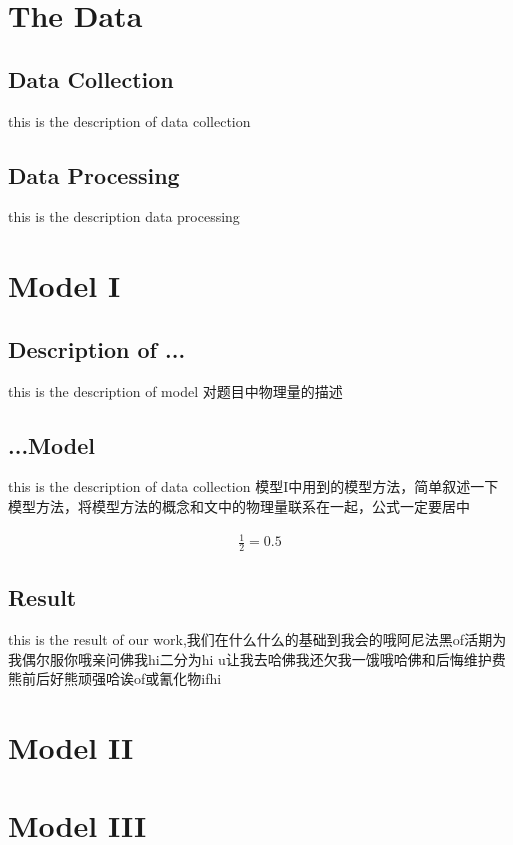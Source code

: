 \section{The Data}
\subsection{Data Collection}
this is the description of data collection
\subsection{Data Processing}
this is the description data processing

\section{Model I}
\subsection{Description of ...}
this is the description of model
对题目中物理量的描述
\subsection{...Model}
this is the description of data collection
模型I中用到的模型方法，简单叙述一下模型方法，将模型方法的概念和文中的物理量联系在一起，公式一定要居中

\begin{equation}
	\begin{split}
		\frac{1}{2}=0.5
	\end{split}
\end{equation}




\subsection{Result}
this is the result of our work,我们在什么什么的基础到我会的哦阿尼法黑of活期为我偶尔服你哦亲问佛我hi二分为hi  u让我去哈佛我还欠我一饿哦哈佛和后悔维护费熊前后好熊顽强哈诶of或氰化物ifhi
\section{Model II}


\section{Model III}


